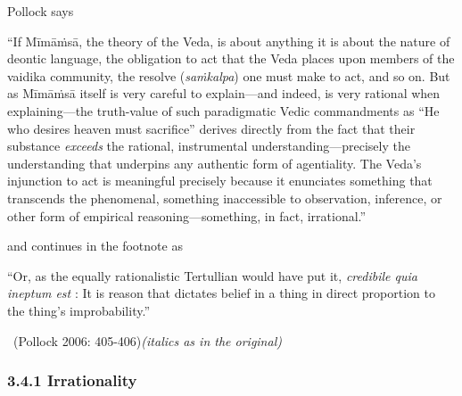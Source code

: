 Pollock says

\begin{myquote}
“If Mīmāṁsā, the theory of the Veda, is about anything it is about the nature of deontic language, the obligation to act that the Veda places upon members of the vaidika community, the resolve (\textit{saṁkalpa}) one must make to act, and so on. But as Mīmāṁsā itself is very careful to explain—and indeed, is very rational when explaining—the truth-value of such paradigmatic Vedic commandments as “He who desires heaven must sacrifice” derives directly from the fact that their substance \textit{exceeds} the rational, instrumental understanding—precisely the understanding that underpins any authentic form of agentiality. The Veda’s injunction to act is meaningful precisely because it enunciates something that transcends the phenomenal, something inaccessible to observation, inference, or other form of empirical reasoning—something, in fact, irrational.”
\end{myquote}

and continues in the footnote as

\begin{myquote}
“Or, as the equally rationalistic Tertullian would have put it, \textit{credibile quia ineptum est} : It is reason that dictates belief in a thing in direct proportion to the thing’s improbability.” 

~\hfill (Pollock 2006: 405-406)\textit{(italics as in the original)}
\end{myquote}


\subsubsection*{3.4.1 Irrationality}

